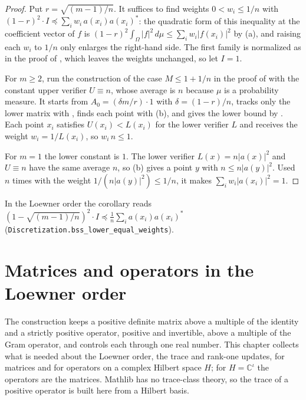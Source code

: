 \begin{proof}
\leanok
{}
Put $r = \sqrt{(m-1)/n}$. It suffices to find weights $0 < w_i \leq 1/n$ with
$(1 - r)^2 \cdot I \preceq \sum_i w_i \, a(x_i) a(x_i)^*$: the quadratic form of this
inequality at the coefficient vector of $f$ is
$(1 - r)^2 \int_\Omega |f|^2 \, d\mu \leq \sum_i w_i |f(x_i)|^2$ by
(a), and raising each $w_i$ to $1/n$ only enlarges the right-hand
side. The first family is normalized as in the proof of , which
leaves the weights unchanged, so let $I = 1$.

For $m \geq 2$, run the construction of the case $M \leq 1 + 1/n$ in the proof of
 with the constant upper verifier $U \equiv n$, whose average is
$n$ because $\mu$ is a probability measure. It starts from $A_0 = (\delta m / r) \cdot 1$
with $\delta = (1-r)/n$, tracks only the lower matrix with , finds
each point with (b), and gives the lower bound by
. Each point $x_i$ satisfies $U(x_i) < L(x_i)$ for the lower
verifier $L$ and receives the weight $w_i = 1/L(x_i)$, so $w_i \, n \leq 1$.

For $m = 1$ the lower constant is $1$. The lower verifier $L(x) = n |a(x)|^2$ and
$U \equiv n$ have the same average $n$, so (b) gives a point
$y$ with $n \leq n |a(y)|^2$. Used $n$ times with the weight $1/(n |a(y)|^2) \leq 1/n$, it
makes $\sum_i w_i |a(x_i)|^2 = 1$.
\end{proof}

In the Loewner order the corollary reads
$(1 - \sqrt{(m-1)/n})^2 \cdot I \preceq \frac{1}{n} \sum_i a(x_i) a(x_i)^*$
(\texttt{Discretization.bss\_lower\_equal\_weights}).

\chapter{Matrices and operators in the Loewner order}
\label{ch:loewner}

The construction keeps a positive definite matrix above a multiple of the identity and a
strictly positive operator, positive and invertible, above a multiple of the Gram operator,
and controls each through one real number. This chapter collects what is needed about the
Loewner order, the trace and rank-one updates, for matrices and for operators on a complex
Hilbert space $H$; for $H = \mathbb{C}^{\iota}$ the operators are the matrices. Mathlib has
no trace-class theory, so the trace of a positive operator is built here from a Hilbert
basis.

